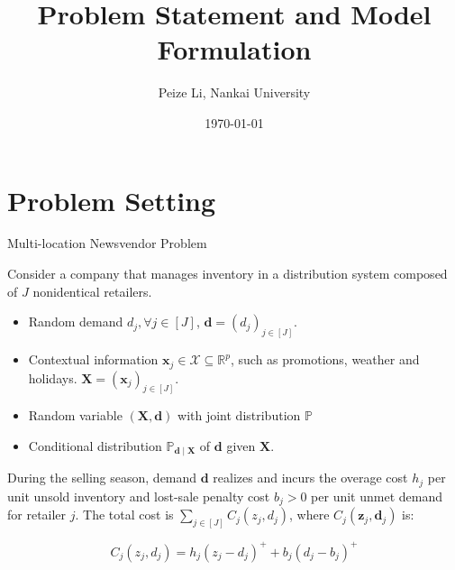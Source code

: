\documentclass{beamer}
\title{Problem Statement and Model Formulation}
\author{Peize Li, Nankai University
}
\date{\today}
\newcommand{\mb}[1]{{\mathbf{#1}}}
\newcommand{\bbp}{\mathbb{P}}
\newcommand{\bbr}{\mathbb{R}}
\newcommand{\cX}{\mathcal{X}}
\begin{document}
\maketitle

\section{Problem Setting}



\begin{frame}{Multi-location Newsvendor Problem}

Consider a company that manages inventory in a distribution system composed of $J$ nonidentical retailers. \\

\vspace{0.3cm}

\begin{itemize}
\item Random demand ${d}_j, \forall j\in[J]$, ${\bm d} = ({d}_j)_{j \in [J]}$.
\item Contextual information ${\bm x}_j \in \cX \subseteq \bbr^p$, such as promotions, weather and holidays. ${\mb X} = ({\bm x}_j)_{j \in [J]}$.
\item Random variable $( {\mb X}, {\bm d})$ with joint distribution $\bbp$
\item Conditional distribution $\bbp_{\bm d \mid \mb X}$ of $\bm d$ given $\mb X$.
\end{itemize}
\vspace{0.3cm}

During the selling season, demand $\bm d$ realizes and incurs the overage cost $h_j$ per unit unsold inventory and lost-sale penalty cost $b_j > 0$ per unit unmet demand for retailer $j$. The total cost is $\sum_{j \in [J]} C_j (z_j,  d_j)$, where $C_j (\bm z_j, \bm d_j)$ is:

{\large
\[
 C_j (z_j,  d_j) =  h_j (z_j - d_j)^+ + b_j (d_j -b_j)^+ 
\]
}
\end{frame}

\end{document}
